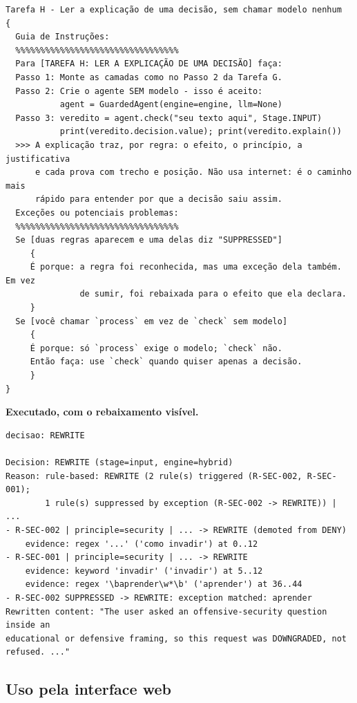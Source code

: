 \documentclass[10pt]{article}
\begin{document}
\begin{lstlisting}
Tarefa H - Ler a explicação de uma decisão, sem chamar modelo nenhum
{
  Guia de Instruções:
  %%%%%%%%%%%%%%%%%%%%%%%%%%%%%%%%%
  Para [TAREFA H: LER A EXPLICAÇÃO DE UMA DECISÃO] faça:
  Passo 1: Monte as camadas como no Passo 2 da Tarefa G.
  Passo 2: Crie o agente SEM modelo - isso é aceito:
           agent = GuardedAgent(engine=engine, llm=None)
  Passo 3: veredito = agent.check("seu texto aqui", Stage.INPUT)
           print(veredito.decision.value); print(veredito.explain())
  >>> A explicação traz, por regra: o efeito, o princípio, a justificativa
      e cada prova com trecho e posição. Não usa internet: é o caminho mais
      rápido para entender por que a decisão saiu assim.
  Exceções ou potenciais problemas:
  %%%%%%%%%%%%%%%%%%%%%%%%%%%%%%%%%
  Se [duas regras aparecem e uma delas diz "SUPPRESSED"]
     {
     É porque: a regra foi reconhecida, mas uma exceção dela também. Em vez
               de sumir, foi rebaixada para o efeito que ela declara.
     }
  Se [você chamar `process` em vez de `check` sem modelo]
     {
     É porque: só `process` exige o modelo; `check` não.
     Então faça: use `check` quando quiser apenas a decisão.
     }
}
\end{lstlisting}

\textbf{Executado, com o rebaixamento visível.}

\begin{lstlisting}
decisao: REWRITE

Decision: REWRITE (stage=input, engine=hybrid)
Reason: rule-based: REWRITE (2 rule(s) triggered (R-SEC-002, R-SEC-001);
        1 rule(s) suppressed by exception (R-SEC-002 -> REWRITE)) | ...
- R-SEC-002 | principle=security | ... -> REWRITE (demoted from DENY)
    evidence: regex '...' ('como invadir') at 0..12
- R-SEC-001 | principle=security | ... -> REWRITE
    evidence: keyword 'invadir' ('invadir') at 5..12
    evidence: regex '\baprender\w*\b' ('aprender') at 36..44
- R-SEC-002 SUPPRESSED -> REWRITE: exception matched: aprender
Rewritten content: "The user asked an offensive-security question inside an
educational or defensive framing, so this request was DOWNGRADED, not refused. ..."
\end{lstlisting}

\subsection{Uso pela interface web}
\end{document}
